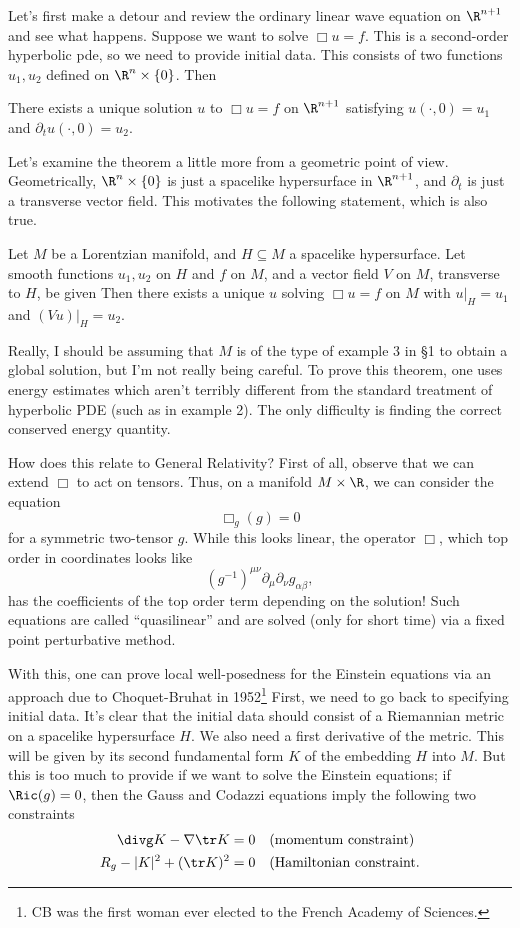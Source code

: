 \documentclass[12pt]{article}
\begin{document}
Let's first make a detour and review the ordinary linear wave equation on $\R^{n+1}$ and see what happens. Suppose we want to solve $\Box u = f$. This is a second-order hyperbolic pde, so we need to provide initial data. This consists of two functions $u_1,u_2$ defined on $\R^n\times\{0\}$. Then
\begin{thm}There exists a unique solution $u$ to $\Box u = f$ on $\R^{n+1}$ satisfying $u(\cdot,0) = u_1$ and $\partial_t u(\cdot,0) = u_2$.\end{thm}
Let's examine the theorem a little more from a geometric point of view. Geometrically, $\R^{n}\times \{0\}$ is just a spacelike hypersurface in $\R^{n+1}$, and $\partial_t$ is just a transverse vector field. This motivates the following statement, which is also true.
\begin{thm}Let $M$ be a Lorentzian manifold, and $H \subseteq M$ a spacelike hypersurface. Let smooth functions $u_1,u_2$ on $H$ and $f$ on $M$, and a vector field $V$ on $M$, transverse to $H$, be given Then there exists a unique $u$ solving $\Box u = f$ on $M$ with $u|_{H} = u_1$ and $(Vu)|_{H} = u_2$.\end{thm}
Really, I should be assuming that $M$ is of the type of example 3 in \S 1 to obtain a global solution, but I'm not really being careful. To prove this theorem, one uses energy estimates which aren't terribly different from the standard treatment of hyperbolic PDE (such as in example 2). The only difficulty is finding the correct conserved energy quantity.

How does this relate to General Relativity? First of all, observe that we can extend $\Box$ to act on tensors. Thus, on a manifold $M\times \R$, we can consider the equation
\[\Box_g(g) = 0\] for a symmetric two-tensor $g$. While this looks linear, the operator $\Box$, which top order in coordinates looks like
\[(g^{-1})^{\mu\nu}\partial_\mu\partial_\nu g_{\alpha\beta},\] has the coefficients of the top order term depending on the solution! Such equations are called ``quasilinear'' and are solved (only for short time) via a fixed point perturbative method.

With this, one can prove local well-posedness for the Einstein equations via an approach due to Choquet-Bruhat in 1952\footnote{CB was the first woman ever elected to the French Academy of Sciences.} First, we need to go back to specifying initial data. It's clear that the initial data should consist of a Riemannian metric on a spacelike hypersurface $H$. We also need a first derivative of the metric. This will be given by its second fundamental form $K$ of the embedding $H$ into $M$. But this is too much to provide if we want to solve the Einstein equations; if $\Ric(g) = 0$, then the Gauss and Codazzi equations imply the following two constraints
\begin{align*}
\divg K -\nabla \tr K = 0 \ \ \ &(\text{momentum constraint})\\
R_g - |K|^2 + (\tr K)^2 = 0\ \ \ &(\text{Hamiltonian constraint}.\end{align*}
\end{document}
